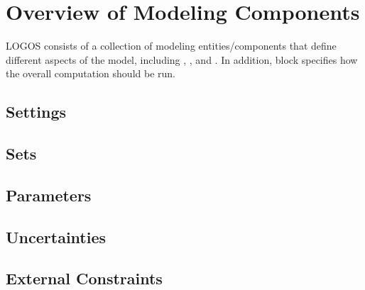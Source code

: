 \section{Overview of Modeling Components}
\label{sec:ModelingComponents}

LOGOS consists of a collection of modeling entities/components that define different
aspects of the model, including , ,
 and . In addition, 
block specifies how the overall computation should be run.

\subsection{Settings}

\subsection{Sets}

\subsection{Parameters}

\subsection{Uncertainties}

\subsection{External Constraints}

